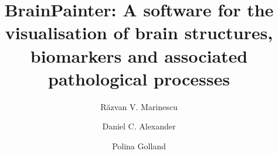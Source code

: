 \documentclass[final,5p,times,twocolumn,authoryear]{elsarticle}
\begin{document}
\begin{frontmatter}

\title{BrainPainter: A software for the visualisation of brain structures, biomarkers and associated pathological processes}


\address[mit]{Computer Science and Artificial Intelligence Laboratory, Massachusetts Institute of Technology, Cambridge, USA, MA 02139}
\address[ucl]{Centre for Medical Image Computing, University College London, Gower Street, London, United Kingdom, WC1E 6BT}

\author[mit,ucl]{R\u{a}zvan V. Marinescu}
\author[ucl]{Daniel C. Alexander}
\author[mit]{Polina Golland}

% 


\end{frontmatter}
\end{document}
